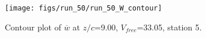 \begin{figure}[H]
\centering
\texttt{[image: figs/run\_50/run\_50\_W\_contour]}
\caption{Contour plot of $\overline{w}$ at $z/c$=9.00, $V_{free}$=33.05, station 5.}
\end{figure}


